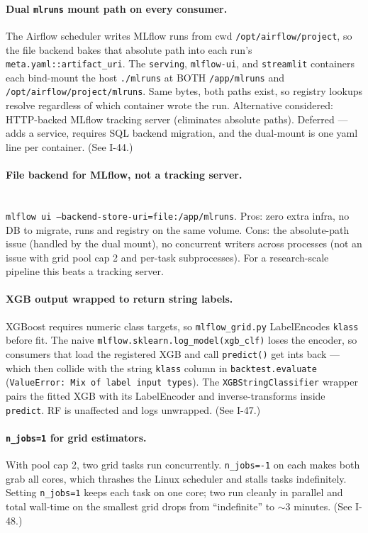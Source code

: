 \documentclass[11pt,a4paper]{article}
\begin{document}
\paragraph{Dual \texttt{mlruns} mount path on every consumer.}
The Airflow scheduler writes MLflow runs from cwd \texttt{/opt/airflow/project}, so the file backend bakes that absolute path into each run's \texttt{meta.yaml::artifact\_uri}. The \texttt{serving}, \texttt{mlflow-ui}, and \texttt{streamlit} containers each bind-mount the host \texttt{./mlruns} at BOTH \texttt{/app/mlruns} and \texttt{/opt/airflow/project/mlruns}. Same bytes, both paths exist, so registry lookups resolve regardless of which container wrote the run. Alternative considered: HTTP-backed MLflow tracking server (eliminates absolute paths). Deferred --- adds a service, requires SQL backend migration, and the dual-mount is one yaml line per container. (See I-44.)

\paragraph{File backend for MLflow, not a tracking server.}
\\
\texttt{mlflow ui --backend-store-uri=file:/app/mlruns}. Pros: zero extra infra, no DB to migrate, runs and registry on the same volume. Cons: the absolute-path issue (handled by the dual mount), no concurrent writers across processes (not an issue with grid pool cap 2 and per-task subprocesses). For a research-scale pipeline this beats a tracking server.

\paragraph{XGB output wrapped to return string labels.}
XGBoost requires numeric class targets, so \texttt{mlflow\_grid.py} LabelEncodes \texttt{klass} before fit. The naive \texttt{mlflow.sklearn.log\_model(xgb\_clf)} loses the encoder, so consumers that load the registered XGB and call \texttt{predict()} get ints back --- which then collide with the string \texttt{klass} column in \texttt{backtest.evaluate} (\texttt{ValueError: Mix of label input types}). The \texttt{XGBStringClassifier} wrapper pairs the fitted XGB with its LabelEncoder and inverse-transforms inside \texttt{predict}. RF is unaffected and logs unwrapped. (See I-47.)

\paragraph{\texttt{n\_jobs=1} for grid estimators.}
With pool cap 2, two grid tasks run concurrently. \texttt{n\_jobs=-1} on each makes both grab all cores, which thrashes the Linux scheduler and stalls tasks indefinitely. Setting \texttt{n\_jobs=1} keeps each task on one core; two run cleanly in parallel and total wall-time on the smallest grid drops from ``indefinite'' to ${\sim}3$ minutes. (See I-48.)
\end{document}
